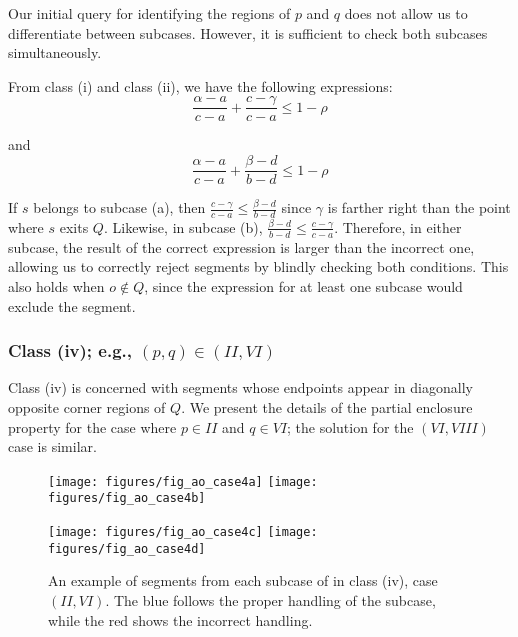 Our initial query for identifying the regions of $p$ and $q$ does not allow us to differentiate between subcases. However, it is sufficient to check both subcases simultaneously.

From class (i) and class (ii), we have the following expressions:
\[ 
\frac{\alpha - a}{c - a} + \frac{c - \gamma}{c - a} \leq 1 - \rho
\]

\noindent and
\[ 
\frac{\alpha - a}{c - a} + \frac{\beta - d}{b - d} \leq 1 - \rho
\]

If $s$ belongs to subcase (a), then $\frac{c - \gamma}{c - a} \leq \frac{\beta - d}{b - d}$ since $\gamma$ is farther right than the point where $s$ exits $Q$. Likewise, in subcase (b), $\frac{\beta - d}{b - d} \leq \frac{c - \gamma}{c - a}$.  Therefore, in either subcase, the result of the correct expression is larger than the incorrect one, allowing us to correctly reject segments by blindly checking both conditions.  This also holds when $o \not \in Q$, since the expression for at least one subcase would exclude the segment.


\subsubsection{Class (iv); e.g., $(p, q) \in (II, VI)$}
\label{:rectanges:ao:class4}

Class (iv) is concerned with segments whose endpoints appear in diagonally opposite corner regions of $Q$. 
We present the details of the partial enclosure property for the case where $p \in II$ and $q \in VI$; the solution for the $(VI, VIII)$ case is similar.

\begin{figure}[t]
\begin{center}
  \texttt{[image: figures/fig\_ao\_case4a]}
  \hspace{1.0em}
  \texttt{[image: figures/fig\_ao\_case4b]}

  \vspace{2.0em}
  
  \texttt{[image: figures/fig\_ao\_case4c]}
  \hspace{1.0em}
  \texttt{[image: figures/fig\_ao\_case4d]}

  \caption[An example of a segment in class (iv), case $(II, VI)$.]{An example of segments from each subcase of in class (iv), case $(II, VI)$. The blue follows the proper handling of the subcase, while the red shows the incorrect handling.}
  \label{fig:rectangles:ao:case4}
\end{center}
\end{figure}

